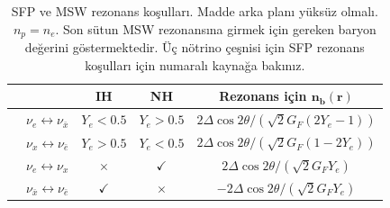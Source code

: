 \begin{table}[hbt!]
	\centering
	\begin{tabular}{c|c|c|c|c|}
	  &
	  & \textbf{IH} & \textbf{NH} & \textbf{Rezonans için} $\mathbf{n_{b}(r)}$ \\ 
	  \hline
	  \multirow{2}{*}{\STAB{\rotatebox[origin=c]{90}{\tiny \textbf{SFP}}}} &     $\nu_{e} \leftrightarrow \nu_{\bar{x}}$ & $ Y_{e}<0.5 $  & $ Y_{e}>0.5 $ & $ 2\Delta\cos 2\theta/ 
     \left(\sqrt{2}G_{F}(2Y_{e}-1) \right)$ \\ \cline{2-5}
     & $\nu_{x} \leftrightarrow \nu_{\bar{e}}$ & $ Y_{e}>0.5 $ & $ Y_{e}<0.5 $ & $ 2\Delta\cos 2\theta/ \left(\sqrt{2}G_{F}(1-2Y_{e})  \right)$ \\ \hline
	  \multirow{2}{*}{\STAB{\rotatebox[origin=c]{90}{\tiny \textbf{MSW}}}} & $\nu_{e} \leftrightarrow \nu_{x}$ & $\times $ & $\checkmark$ & $ 2\Delta\cos 2\theta/ \left(\sqrt{2}G_{F}Y_{e} \right)$\\
	   \cline{2-5}
	   & $\nu_{\bar{x}} \leftrightarrow \nu_{\bar{e}}$
	   &  $\checkmark$ & $\times $ & $-2\Delta\cos 2\theta/ \left(\sqrt{2}G_{F}Y_{e} \right)$\\
	   \hline
	\end{tabular}
	\caption[SFP ve MSW rezonans koşulları]{\label{tab:ResonanceCond}SFP ve MSW rezonans koşulları. Madde arka planı yüksüz olmalı. $ n_{p} = n_{e} $. Son sütun MSW rezonansına girmek için gereken baryon değerini göstermektedir. Üç nötrino çeşnisi için SFP rezonans koşulları için \cite{Akhmedov:2003fu} numaralı kaynağa bakınız.}
\end{table}


